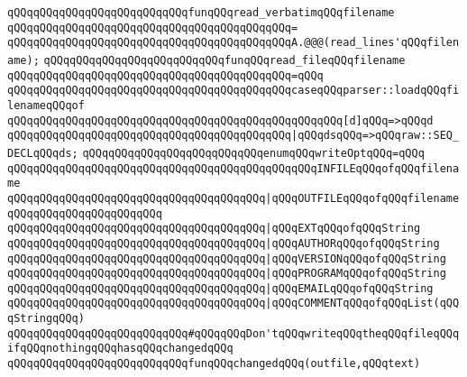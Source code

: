 \newline
\verb|qQQqqQQqqQQqqQQqqQQqqQQqqQQqfunqQQqread_verbatimqQQqfilename|\newline
\verb|qQQqqQQqqQQqqQQqqQQqqQQqqQQqqQQqqQQqqQQqqQQq=|\newline
\verb|qQQqqQQqqQQqqQQqqQQqqQQqqQQqqQQqqQQqqQQqqQQqA.@@@(read_lines'qQQqfilename);|\newline
\newline
\verb|qQQqqQQqqQQqqQQqqQQqqQQqqQQqfunqQQqread_fileqQQqfilename|\newline
\verb|qQQqqQQqqQQqqQQqqQQqqQQqqQQqqQQqqQQqqQQqqQQq=qQQq|\newline
\verb|qQQqqQQqqQQqqQQqqQQqqQQqqQQqqQQqqQQqqQQqqQQqcaseqQQqparser::loadqQQqfilenameqQQqof|\newline
\verb|qQQqqQQqqQQqqQQqqQQqqQQqqQQqqQQqqQQqqQQqqQQqqQQqqQQq[d]qQQq=>qQQqd|\newline
\verb|qQQqqQQqqQQqqQQqqQQqqQQqqQQqqQQqqQQqqQQqqQQq|\verb#|qQQqdsqQQq=>qQQqraw::SEQ_DECLqQQqds;#\newline
\newline
\verb|qQQqqQQqqQQqqQQqqQQqqQQqqQQqenumqQQqwriteOptqQQq=qQQq|\newline
\verb|qQQqqQQqqQQqqQQqqQQqqQQqqQQqqQQqqQQqqQQqqQQqqQQqINFILEqQQqofqQQqfilename|\newline
\verb|qQQqqQQqqQQqqQQqqQQqqQQqqQQqqQQqqQQqqQQq|\verb#|qQQqOUTFILEqQQqofqQQqfilenameqQQqqQQqqQQqqQQqqQQqqQQq#\newline
\verb|qQQqqQQqqQQqqQQqqQQqqQQqqQQqqQQqqQQqqQQq|\verb#|qQQqEXTqQQqofqQQqString#\newline
\verb|qQQqqQQqqQQqqQQqqQQqqQQqqQQqqQQqqQQqqQQq|\verb#|qQQqAUTHORqQQqofqQQqString#\newline
\verb|qQQqqQQqqQQqqQQqqQQqqQQqqQQqqQQqqQQqqQQq|\verb#|qQQqVERSIONqQQqofqQQqString#\newline
\verb|qQQqqQQqqQQqqQQqqQQqqQQqqQQqqQQqqQQqqQQq|\verb#|qQQqPROGRAMqQQqofqQQqString#\newline
\verb|qQQqqQQqqQQqqQQqqQQqqQQqqQQqqQQqqQQqqQQq|\verb#|qQQqEMAILqQQqofqQQqString#\newline
\verb|qQQqqQQqqQQqqQQqqQQqqQQqqQQqqQQqqQQqqQQq|\verb#|qQQqCOMMENTqQQqofqQQqList(qQQqStringqQQq)#\newline
\newline
\newline
\verb|qQQqqQQqqQQqqQQqqQQqqQQqqQQq#qQQqqQQqDon'tqQQqwriteqQQqtheqQQqfileqQQqifqQQqnothingqQQqhasqQQqchangedqQQq|\newline
\verb|qQQqqQQqqQQqqQQqqQQqqQQqqQQqfunqQQqchangedqQQq(outfile,qQQqtext)|\newline
